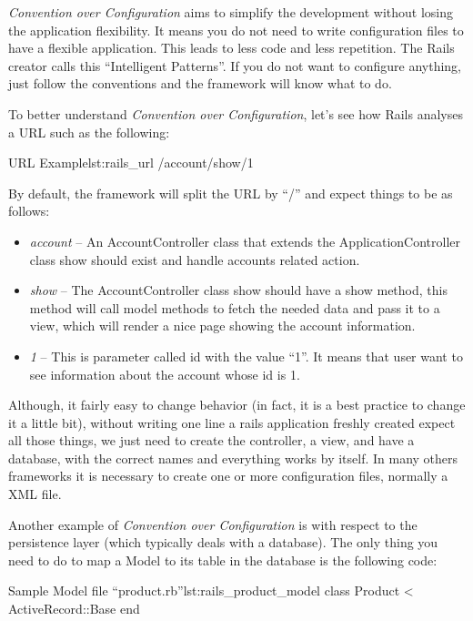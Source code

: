 \emph{Convention over Configuration} aims to simplify the development without losing the application flexibility. 
It means you do not need to write configuration files to have a flexible application. 
This leads to less code and less repetition.
The Rails creator calls this “Intelligent Patterns”. 
If you do not want to configure anything, just follow the conventions and the framework will know what to do.

To better understand \emph{Convention over Configuration}, 
let's see how Rails analyses a URL such as the following:

\begin{rubycode}{URL Example}{lst:rails_url}
  /account/show/1

\end{rubycode}
By default, the framework will split the URL by “/” and expect things to be as follows: 

\begin{itemize}
\item \emph{account} – An AccountController class that extends the ApplicationController class show should exist and
handle accounts related action.
\item \emph{show} – The AccountController class show should have a show method, 
this method will call model methods to fetch the needed data and pass it to a view, 
which will render a nice page showing the account information.
\item \emph{1} – This is parameter called id with the value “1”. 
It means that user want to see information about the account whose id is 1. 
\end{itemize}

Although, it fairly easy to change behavior (in fact, it is a best practice to change it a little bit), 
without writing one line a rails application freshly created expect all those things, 
we just need to create the controller, a view, and have a database, with the correct names and everything works by itself. 
In many others frameworks it is necessary to create one or more configuration files, normally a XML file.

Another example of \emph{Convention over Configuration} is with respect to the persistence layer 
(which typically deals with a database). 
The only thing you need to do to map a Model to its table in the database is the following code:
\begin{rubycode}{Sample Model file “product.rb”}{lst:rails_product_model}
class Product < ActiveRecord::Base 
end
\end{rubycode}

